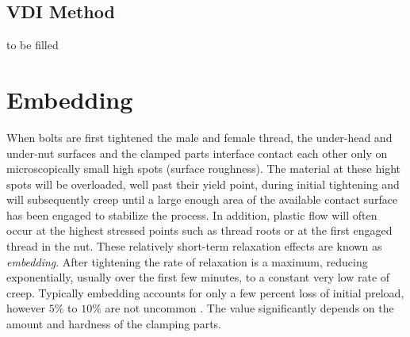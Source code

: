 \subsection{VDI Method}
to be filled

\section{Embedding}
\label{sec:embedding}
When bolts are first tightened the male and female thread, the under-head and under-nut surfaces and the 
clamped parts interface contact each other only on microscopically small high spots (surface roughness).
The material at these hight spots will be overloaded, well past their yield point, during initial 
tightening and will subsequently creep until a large enough area of the available contact surface has 
been engaged to stabilize the process. In addition, plastic flow will often occur at the highest stressed 
points such as thread roots or at the first engaged thread in the nut. These relatively short-term 
relaxation effects are known as \emph{embedding}. After tightening the rate of relaxation is a maximum, 
reducing exponentially, usually over the first few minutes, to a constant very low rate of creep. 
Typically embedding accounts for only a few percent loss of initial preload, however $5\%$ to $10\%$ are
not uncommon \cite{ECSS_HB_32_23A}. The value significantly depends on the amount and hardness of the 
clamping parts. 

